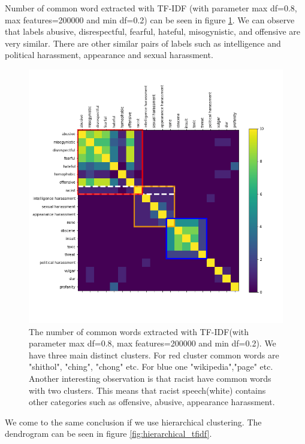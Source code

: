 \documentclass[fleqn,moreauthors,10pt]{ds_report}
\begin{document}
Number of common word extracted with TF-IDF (with parameter max df=0.8, max features=200000 and min df=0.2) can be seen in figure \ref{fig:common_tfidf}. We can observe that labels abusive, disrespectful, fearful, hateful, misogynistic, and offensive are very similar. There are other similar pairs of labels such as intelligence and political harassment, appearance and sexual harassment.
\begin{figure}
    \centering
    \includegraphics[width=\columnwidth]{fig/heatmap_of_common_words.png}
    \caption{The number of common words extracted with TF-IDF(with parameter max df=0.8, max features=200000 and min df=0.2). We have three main distinct clusters. For red cluster common words are "shithol", "ching", "chong" etc. For blue one "wikipedia","page" etc. Another interesting observation is that racist have common words with two clusters. This means that racist speech(white) contains other categories such as offensive, abusive, appearance harassment.}
    \label{fig:common_tfidf}
\end{figure}
We come to the same conclusion if we use hierarchical clustering. The dendrogram can be seen in figure \ref{fig:hierarchical_tfidf}.
\end{document}
